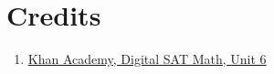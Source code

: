 \documentclass{article}
\begin{document}
\section{Credits}
\begin{enumerate}

	\item{
	      \href{https://www.khanacademy.org/test-prep/v2-sat-math/x0fcc98a58ba3bea7:algebra-medium}{Khan Academy, Digital SAT Math, Unit 6}}

\end{enumerate}
\end{document}
